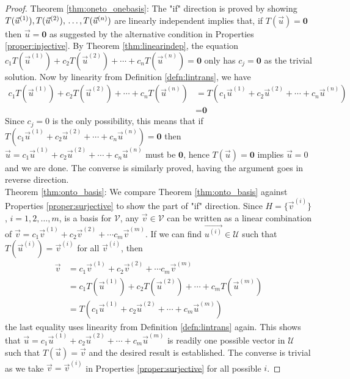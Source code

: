 \begin{proof}
Theorem \ref{thm:oneto_onebasis}: The "if" direction is proved by showing $T(\vec{u}^{(1)}), T(\vec{u}^{(2)}),\\ \ldots, T(\vec{u}^{(n)})$ are linearly independent implies that, if $T(\vec{u}) = \textbf{0}$ then $\vec{u} = \textbf{0}$ as suggested by the alternative condition in Properties \ref{proper:injective}. By Theorem \ref{thm:linearindep}, the equation $c_1T(\vec{u}^{(1)}) + c_2T(\vec{u}^{(2)}) + \cdots + c_nT(\vec{u}^{(n)}) = \textbf{0}$ only has $c_j = \textbf{0}$ as the trivial solution. Now by linearity from Definition \ref{defn:lintrans}, we have
\begin{align*}
c_1T(\vec{u}^{(1)}) + c_2T(\vec{u}^{(2)}) + \cdots + c_nT(\vec{u}^{(n)}) &= T(c_1\vec{u}^{(1)} + c_2\vec{u}^{(2)} + \cdots + c_n\vec{u}^{(n)}) \\
&= \textbf{0}    
\end{align*}
Since $c_j = 0$ is the only possibility, this means that if $T(c_1\vec{u}^{(1)} + c_2\vec{u}^{(2)} + \cdots + c_n\vec{u}^{(n)}) = \textbf{0}$ then $\vec{u} = c_1\vec{u}^{(1)} + c_2\vec{u}^{(2)} + \cdots + c_n\vec{u}^{(n)}$ must be $\textbf{0}$, hence $T(\vec{u}) = \textbf{0}$ implies $\vec{u} = 0$ and we are done. The converse is similarly proved,  having the argument goes in reverse direction. \\
Theorem \ref{thm:onto_basis}: We compare Theorem \ref{thm:onto_basis} against Properties \ref{proper:surjective} to show the part of "if" direction. Since $H = \{\vec{v}^{(i)}\}$, $i = 1,2,\ldots,m$, is a basis for $\mathcal{V}$, any $\vec{v} \in \mathcal{V}$ can be written as a linear combination of $\vec{v} = c_1\vec{v}^{(1)} + c_2\vec{v}^{(2)} + \cdots c_m\vec{v}^{(m)}$. If we can find $\vec{u^{(i)}} \in \mathcal{U}$ such that $T(\vec{u}^{(i)}) = \vec{v}^{(i)}$ for all $\vec{v}^{(i)}$, then
\begin{align*}
\vec{v} &= c_1\vec{v}^{(1)} + c_2\vec{v}^{(2)} + \cdots c_m\vec{v}^{(m)}\\
&= c_1T(\vec{u}^{(1)}) + c_2T(\vec{u}^{(2)}) + \cdots + c_mT(\vec{u}^{(m)}) \\
&= T(c_1\vec{u}^{(1)} + c_2\vec{u}^{(2)} + \cdots + c_m\vec{u}^{(m)})
\end{align*}
the last equality uses linearity from Definition \ref{defn:lintrans} again. This shows that $\vec{u} = c_1\vec{u}^{(1)} + c_2\vec{u}^{(2)} + \cdots + c_m\vec{u}^{(m)}$ is readily one possible vector in $\mathcal{U}$ such that $T(\vec{u}) = \vec{v}$ and the desired result is established. The converse is trivial as we take $\vec{v} = \vec{v}^{(i)}$ in Properties \ref{proper:surjective} for all possible $i$.
\end{proof}

